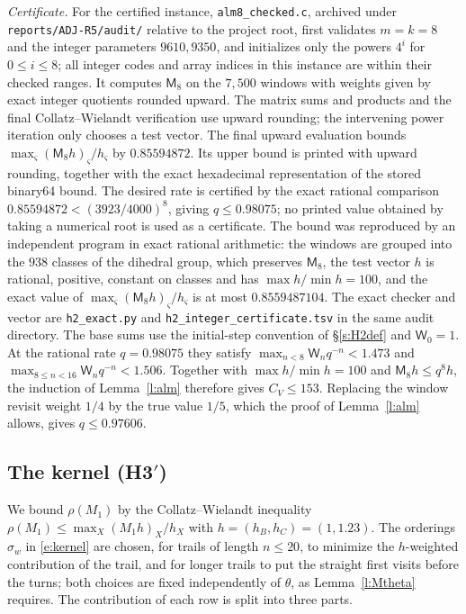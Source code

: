 \emph{Certificate.}
For the certified instance, \texttt{alm8\_checked.c}, archived under \texttt{reports/ADJ-R5/audit/} relative to the project root, first validates $m=k=8$ and the integer parameters $9610,9350$, and initializes only the powers $4^i$ for $0\le i\le8$; all integer codes and array indices in this instance are within their checked ranges.
It computes $\mathsf M_8$ on the $7{,}500$ windows with weights given by exact integer quotients rounded upward.
The matrix sums and products and the final Collatz--Wielandt verification use upward rounding; the intervening power iteration only chooses a test vector. The final upward evaluation bounds
$\max_\varsigma(\mathsf M_8h)_\varsigma/h_\varsigma$ by $0.85594872$.
Its upper bound is printed with upward rounding, together with the exact hexadecimal representation of the stored binary64 bound.
The desired rate is certified by the exact rational comparison
$0.85594872<(3923/4000)^8$, giving $q\le0.98075$;
no printed value obtained by taking a numerical root is used as a certificate. The bound was reproduced by an independent program in exact rational arithmetic: the windows are grouped into the $938$ classes of the dihedral group, which preserves $\mathsf M_8$, the test vector $h$ is rational, positive, constant on classes and has $\max h / \min h = 100$, and the exact value of $\max_\varsigma (\mathsf M_8 h)_\varsigma / h_\varsigma$ is at most $0.8559487104$. The exact checker and vector are \texttt{h2\_exact.py} and \texttt{h2\_integer\_certificate.tsv} in the same audit directory. The base sums use the initial-step convention of \S\ref{s:H2def} and $\mathsf W_0=1$.
At the rational rate $q=0.98075$ they satisfy
$\max_{n<8}\mathsf W_nq^{-n}<1.473$ and
$\max_{8\le n<16}\mathsf W_nq^{-n}<1.506$.
Together with $\max h/\min h=100$ and $\mathsf M_8h\le q^8h$, the induction of Lemma~\ref{l:alm} therefore gives $C_V\le153$. Replacing the window revisit weight $1/4$ by the true value $1/5$, which the proof of Lemma~\ref{l:alm} allows, gives $q \le 0.97606$.

\subsection{The kernel (H3$'$)}\label{s:H3}

We bound $\rho(M_1)$ by the Collatz--Wielandt inequality $\rho(M_1) \le \max_X (M_1 h)_X / h_X$ with $h = (h_B, h_C) = (1, 1.23)$. The orderings $\sigma_w$ in \eqref{e:kernel} are chosen, for trails of length $n \le 20$, to minimize the $h$-weighted contribution of the trail, and for longer trails to put the straight first visits before the turns; both choices are fixed independently of $\theta$, as Lemma~\ref{l:Mtheta} requires. The contribution of each row is split into three parts.

